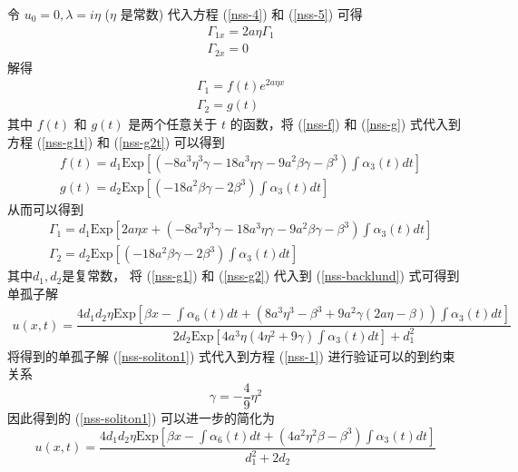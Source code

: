 令 $u_{0} = 0, \lambda = i\eta$ ($\eta$ 是常数) 代入方程 (\ref{nss-4}) 和 (\ref{nss-5}) 可得
\begin{align}
  & \Gamma_{1x} = 2a\eta\Gamma_{1} \\
  & \Gamma_{2x} = 0
\end{align}
解得
\begin{align}
  & \Gamma_{1} = f(t)e^{2a\eta x} \label{nss-f} \\
  & \Gamma_{2} = g(t)  \label{nss-g}
\end{align}
其中 $f(t)$ 和 $g(t)$ 是两个任意关于  $t$ 的函数，将 (\ref{nss-f}) 和 (\ref{nss-g}) 式代入到方程 (\ref{nss-g1t}) 和 (\ref{nss-g2t}) 可以得到
\begin{align}
  & f(t) = d_{1}\mathrm{Exp}\left[\left(-8a^3\eta^3\gamma-18a^3\eta \gamma-9a^2\beta \gamma - \beta^3\right)\int \alpha_{3}(t)dt\right] \\
  & g(t) = d_{2}\mathrm{Exp}\left[\left(-18a^2\beta \gamma-2\beta^3\right)\int \alpha_{3}(t)dt\right]
\end{align}
从而可以得到
\begin{align}
  & \Gamma_{1} = d_{1}\mathrm{Exp}\left[2a\eta x + \left(-8a^3\eta^3\gamma-18a^3\eta \gamma-9a^2\beta \gamma - \beta^3\right)\int \alpha_{3}(t)dt\right]  \label{nss-g1} \\
  & \Gamma_{2} = d_{2}\mathrm{Exp}\left[\left(-18a^2\beta \gamma-2\beta^3\right)\int \alpha_{3}(t)dt\right]  \label{nss-g2}
\end{align}
其中$d_{1}, d_{2}$是复常数， 将  (\ref{nss-g1}) 和  (\ref{nss-g2}) 代入到  (\ref{nss-backlund}) 式可得到单孤子解
\begin{align}
    u(x,t) = \dfrac{4d_1d_2\eta\mathrm{Exp}\left[\beta x - \int \alpha_6(t)dt + (8a^3\eta^3-\beta^3+9a^2\gamma(2a\eta-\beta))\int \alpha_3(t)dt\right]}{2d_2 \mathrm{Exp}\left[4a^3\eta(4\eta^2+9\gamma)\int \alpha_3(t)dt\right] + d_1^2} \label{nss-soliton1}
\end{align}
将得到的单孤子解 (\ref{nss-soliton1}) 式代入到方程 (\ref{nss-1}) 进行验证可以的到约束关系
\begin{equation}
  \gamma = -\dfrac{4}{9}\eta^2 \label{nss-yuesu}
\end{equation}
因此得到的 (\ref{nss-soliton1}) 可以进一步的简化为
\begin{equation}
  u(x,t) = \frac{4d_1d_2\eta \mathrm{Exp}\left[\beta x - \int \alpha_6(t)dt + (4a^2\eta^2\beta - \beta^3)\int \alpha_3(t)dt\right]}{d_1^2 + 2d_2} \label{nss-soliton2}
\end{equation}

